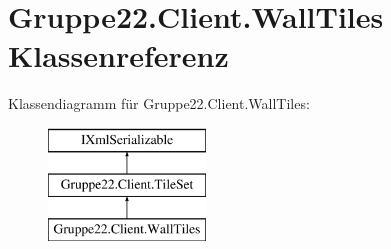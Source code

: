 \hypertarget{class_gruppe22_1_1_client_1_1_wall_tiles}{\section{Gruppe22.\-Client.\-Wall\-Tiles Klassenreferenz}
\label{class_gruppe22_1_1_client_1_1_wall_tiles}
}
Klassendiagramm für Gruppe22.\-Client.\-Wall\-Tiles\-:\begin{figure}[H]
\begin{center}
\leavevmode
\includegraphics[height=3.000000cm]{class_gruppe22_1_1_client_1_1_wall_tiles}
\end{center}
\end{figure}

